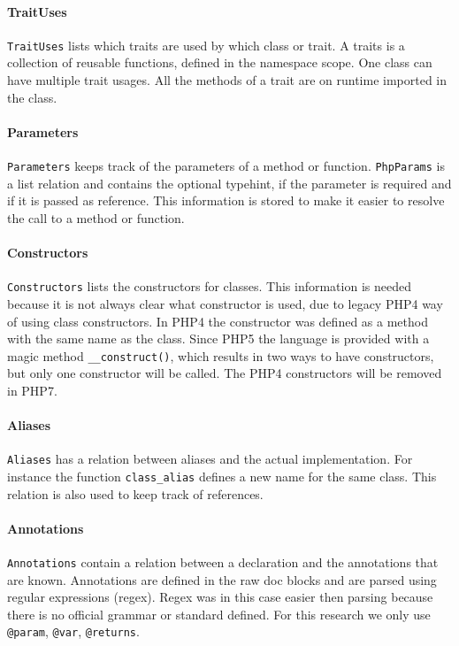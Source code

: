 \documentclass[../main.tex]{subfiles}
\begin{document}
    \paragraph{TraitUses} \texttt{TraitUses} lists which traits are used by which class or trait.
    A traits is a collection of reusable functions, defined in the namespace scope.
    One class can have multiple trait usages.
    All the methods of a trait are on runtime imported in the class.
    
    \paragraph{Parameters} \texttt{Parameters} keeps track of the parameters of a method or function.
    \texttt{PhpParams} is a list relation and contains the optional typehint, if the parameter is required and if it is passed as reference.
    This information is stored to make it easier to resolve the call to a method or function.
    
    \paragraph{Constructors} \texttt{Constructors} lists the constructors for classes. 
    This information is needed because it is not always clear what constructor is used, due to legacy PHP4 way of using class constructors.
    In PHP4 the constructor was defined as a method with the same name as the class.
    Since PHP5 the language is provided with a magic method \texttt{\_\_construct()}, which results in two ways to have constructors, but only one constructor will be called.
    The PHP4 constructors will be removed in PHP7.
    
    \paragraph{Aliases} \texttt{Aliases} has a relation between aliases and the actual implementation.
    For instance the function \texttt{class\_alias} defines a new name for the same class.
    This relation is also used to keep track of references. 
    
    \paragraph{Annotations} \texttt{Annotations} contain a relation between a declaration and the annotations that are known.
    Annotations are defined in the raw doc blocks and are parsed using regular expressions (regex).
    Regex was in this case easier then parsing because there is no official grammar or standard defined.
    For this research we only use \texttt{@param}, \texttt{@var}, \texttt{@returns}.
\end{document}
